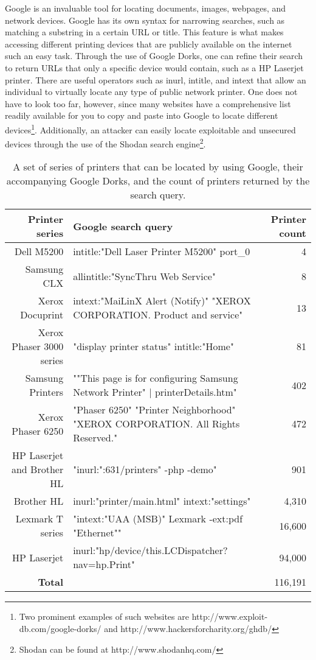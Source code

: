 Google is an invaluable tool for locating documents, images, webpages, and network devices.
Google has its own syntax for narrowing searches, such as matching a substring in a certain URL or title.
This feature is what makes accessing different printing devices that are publicly available on the internet such an easy task.
Through the use of Google Dorks, one can refine their search to return URLs that only a specific device would contain, such as a HP Laserjet printer.
There are useful operators such as inurl, intitle, and intext that allow an individual to virtually locate any type of public network printer.
One does not have to look too far, however, since many websites have a comprehensive list readily available for you to copy and paste into Google to locate different devices\footnote{Two prominent examples of such websites are http://www.exploit-db.com/google-dorks/ and http://www.hackersforcharity.org/ghdb/}.
Additionally, an attacker can easily locate exploitable and unsecured devices through the use of the Shodan search engine\footnote{Shodan can be found at http://www.shodanhq.com/}.

\begin{table*}
    \centering
\label{printer_dorks}
\begin{tabular}{r| p{9cm} | r}
    \hline
    \hline
    {\bf Printer series} & {\bf Google search query} & {\bf Printer count} \\
    \hline    
    Dell M5200 & intitle:"Dell Laser Printer M5200" port\_0 & 4 \\
    \hline
    Samsung CLX & allintitle:"SyncThru Web Service" & 8 \\
    \hline
    Xerox Docuprint & intext:"MaiLinX Alert (Notify)" "XEROX CORPORATION. Product and service" & 13 \\
    \hline
    Xerox Phaser 3000 series & "display printer status" intitle:"Home" & 81 \\
    \hline
    Samsung Printers & ""This page is for configuring Samsung Network Printer" | printerDetails.htm" & 402 \\
    \hline
    Xerox Phaser 6250 & "Phaser 6250" "Printer Neighborhood" "XEROX CORPORATION. All Rights Reserved." & 472 \\
    \hline
    HP Laserjet and Brother HL & "inurl:":631/printers" -php -demo" & 901 \\
    \hline
    Brother HL & inurl:"printer/main.html" intext:"settings" & 4,310 \\
    \hline
    Lexmark T series & "intext:"UAA (MSB)"  Lexmark -ext:pdf "Ethernet"" & 16,600 \\
    \hline
    HP Laserjet & inurl:"hp/device/this.LCDispatcher?nav=hp.Print" & 94,000 \\
    \hline
    \hline
    {\bf Total} & & 116,191 \\
    \hline
\end{tabular}
\caption{A set of series of printers that can be located by using Google, their accompanying Google Dorks, and the count of printers returned by the search query.}
\end{table*}
